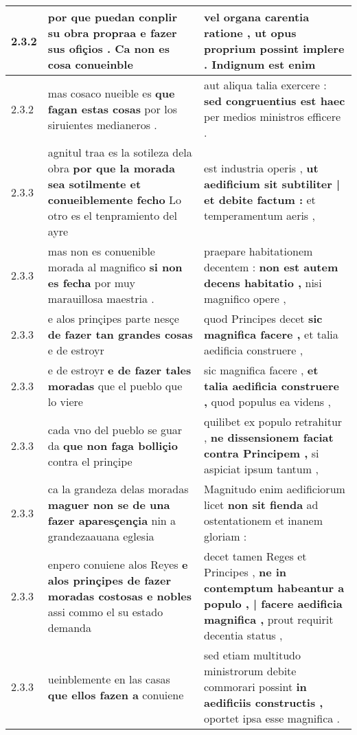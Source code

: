 \begin{tabular}{|p{1cm}|p{6.5cm}|p{6.5cm}|}
2.3.2 & por que puedan conplir su obra \textbf{ propraa e fazer sus ofiçios . } Ca non es cosa conueinble & vel organa carentia ratione , \textbf{ ut opus proprium possint implere . } Indignum est enim \\\hline
2.3.2 & mas cosaco nueible es \textbf{ que fagan estas cosas } por los siruientes medianeros . & aut aliqua talia exercere : \textbf{ sed congruentius est haec } per medios ministros efficere . \\\hline
2.3.3 & agnitul traa es la sotileza dela obra \textbf{ por que la morada sea sotilmente et conueiblemente fecho } Lo otro es el tenpramiento del ayre & est industria operis , \textbf{ ut aedificium sit subtiliter | et debite factum : } et temperamentum aeris , \\\hline
2.3.3 & mas non es conuenible morada al magnifico \textbf{ si non es fecha } por muy marauillosa maestria . & praepare habitationem decentem : \textbf{ non est autem decens habitatio , } nisi magnifico opere , \\\hline
2.3.3 & e alos prinçipes parte nesçe \textbf{ de fazer tan grandes cosas } e de estroyr & quod Principes decet \textbf{ sic magnifica facere , } et talia aedificia construere , \\\hline
2.3.3 & e de estroyr \textbf{ e de fazer tales moradas } que el pueblo que lo viere & sic magnifica facere , \textbf{ et talia aedificia construere , } quod populus ea videns , \\\hline
2.3.3 & cada vno del pueblo se guar da \textbf{ que non faga bolliçio } contra el prinçipe & quilibet ex populo retrahitur , \textbf{ ne dissensionem faciat contra Principem , } si aspiciat ipsum tantum , \\\hline
2.3.3 & ca la grandeza delas moradas \textbf{ maguer non se de una fazer aparesçençia } nin a grandezaauana eglesia & Magnitudo enim aedificiorum licet \textbf{ non sit fienda } ad ostentationem et inanem gloriam : \\\hline
2.3.3 & enpero conuiene alos Reyes \textbf{ e alos prinçipes de fazer moradas costosas e nobles } assi commo el su estado demanda & decet tamen Reges et Principes , \textbf{ ne in contemptum habeantur a populo , | facere aedificia magnifica , } prout requirit decentia status , \\\hline
2.3.3 & ueinblemente en las casas \textbf{ que ellos fazen a } conuiene & sed etiam multitudo ministrorum debite commorari possint \textbf{ in aedificiis constructis , } oportet ipsa esse magnifica . \\\hline

\end{tabular}
